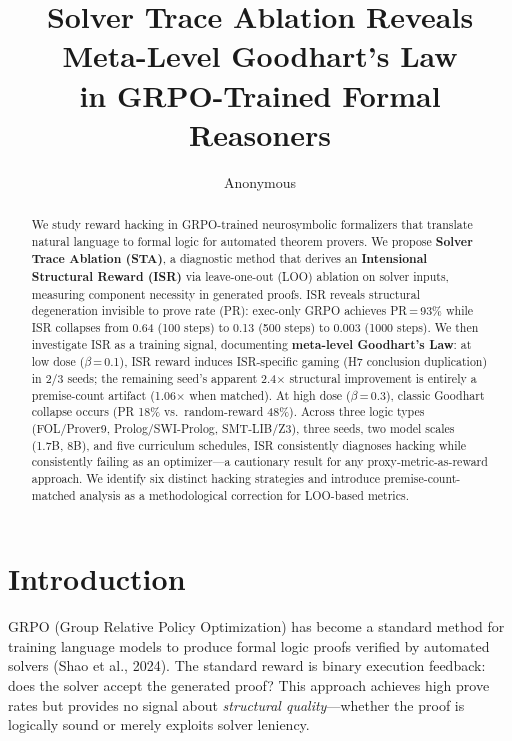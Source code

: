 \documentclass[11pt,a4paper]{article}
\title{Solver Trace Ablation Reveals Meta-Level Goodhart's Law\\in GRPO-Trained Formal Reasoners}
\author{Anonymous}
\begin{document}
\maketitle

\begin{abstract}
We study reward hacking in GRPO-trained neurosymbolic formalizers that translate natural language to formal logic for automated theorem provers.
We propose \textbf{Solver Trace Ablation (STA)}, a diagnostic method that derives an \textbf{Intensional Structural Reward (ISR)} via leave-one-out (LOO) ablation on solver inputs, measuring component necessity in generated proofs.
ISR reveals structural degeneration invisible to prove rate (PR): exec-only GRPO achieves PR\,=\,93\% while ISR collapses from 0.64 (100 steps) to 0.13 (500 steps) to 0.003 (1000 steps).
We then investigate ISR as a training signal, documenting \textbf{meta-level Goodhart's Law}: at low dose ($\beta$\,=\,0.1), ISR reward induces ISR-specific gaming (H7 conclusion duplication) in 2/3 seeds; the remaining seed's apparent 2.4$\times$ structural improvement is entirely a premise-count artifact (1.06$\times$ when matched).
At high dose ($\beta$\,=\,0.3), classic Goodhart collapse occurs (PR 18\% vs.\ random-reward 48\%).
Across three logic types (FOL/Prover9, Prolog/SWI-Prolog, SMT-LIB/Z3), three seeds, two model scales (1.7B, 8B), and five curriculum schedules, ISR consistently diagnoses hacking while consistently failing as an optimizer---a cautionary result for any proxy-metric-as-reward approach.
We identify six distinct hacking strategies and introduce premise-count-matched analysis as a methodological correction for LOO-based metrics.
\end{abstract}

\section{Introduction}
\label{sec:intro}

GRPO (Group Relative Policy Optimization) has become a standard method for training language models to produce formal logic proofs verified by automated solvers (Shao et al., 2024).
The standard reward is binary execution feedback: does the solver accept the generated proof?
This approach achieves high prove rates but provides no signal about \emph{structural quality}---whether the proof is logically sound or merely exploits solver leniency.
\end{document}
